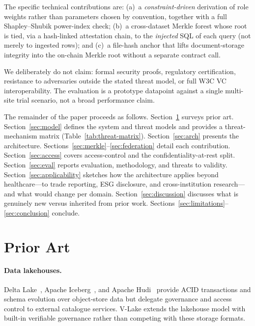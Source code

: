 \documentclass[10pt,twocolumn]{article}
\begin{document}
The specific technical contributions are:
(a)~a \emph{constraint-driven} derivation of role weights rather
than parameters chosen by convention, together with a full
Shapley--Shubik power-index check;
(b)~a cross-dataset Merkle forest whose root is tied, via a
hash-linked attestation chain, to the \emph{injected} SQL of each
query (not merely to ingested rows); and
(c)~a file-hash anchor that lifts document-storage integrity into
the on-chain Merkle root without a separate contract call.

We deliberately do not claim: formal security proofs, regulatory
certification, resistance to adversaries outside the stated threat
model, or full W3C VC interoperability. The evaluation is a
prototype datapoint against a single multi-site trial scenario,
not a broad performance claim.

The remainder of the paper proceeds as follows.
Section~\ref{sec:prior} surveys prior art.
Section~\ref{sec:model} defines the system and threat models and
provides a threat-mechanism matrix (Table~\ref{tab:threat-matrix}).
Section~\ref{sec:arch} presents the architecture.
Sections~\ref{sec:merkle}--\ref{sec:federation} detail each
contribution. Section~\ref{sec:access} covers access-control
and the confidentiality-at-rest split.
Section~\ref{sec:eval} reports evaluation, methodology, and
threats to validity.
Section~\ref{sec:applicability} sketches how the architecture
applies beyond healthcare---to trade reporting, ESG disclosure,
and cross-institution research---and what would change per domain.
Section~\ref{sec:discussion} discusses what is genuinely new versus
inherited from prior work.
Sections~\ref{sec:limitations}--\ref{sec:conclusion} conclude.


\section{Prior Art}
\label{sec:prior}

\paragraph{Data lakehouses.}
Delta Lake~\cite{armbrust2020delta}, Apache Iceberg~\cite{iceberg},
and Apache Hudi~\cite{hudi} provide ACID transactions and schema
evolution over object-store data but delegate governance and access
control to external catalogue services. V-Lake extends the lakehouse
model with built-in verifiable governance rather than competing with
these storage formats.
\end{document}
